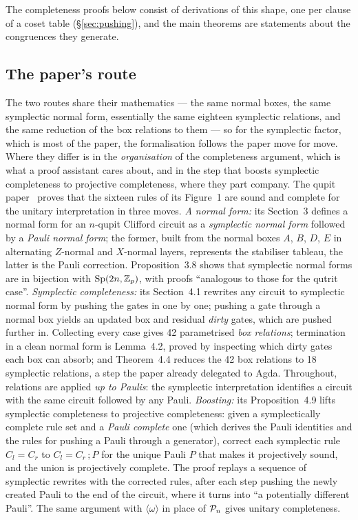\begin{minipage}[c]{0.42\textwidth}\centering
{}
\end{minipage}

\noindent The completeness proofs below consist of derivations of this
shape, one per clause of a coset table (\S\ref{sec:pushing}), and the
main theorems are statements about the congruences they generate.

\subsection{The paper's route}

The two routes share their mathematics --- the same normal boxes, the
same symplectic normal form, essentially the same eighteen symplectic
relations, and the same reduction of the box relations to them --- so
for the symplectic factor, which is most of the paper, the
formalisation follows the paper move for move.  Where they differ is
in the \emph{organisation} of the completeness argument, which is what
a proof assistant cares about, and in the step that boosts symplectic
completeness to projective completeness, where they part company.
The qupit paper~\cite{bian2026qudit} proves that the sixteen rules of
its Figure~1 are sound and complete for the unitary interpretation in
three moves.  \emph{A normal form:} its Section~3 defines a normal form
for an $n$-qupit Clifford circuit as a \emph{symplectic normal form}
followed by a \emph{Pauli normal form}; the former, built from the
normal boxes $A$, $B$, $D$, $E$ in alternating $Z$-normal and $X$-normal
layers, represents the stabiliser tableau, the latter is the Pauli
correction.  Proposition~3.8 shows that symplectic normal forms are in
bijection with $\mathrm{Sp}(2n,\mathbb{Z}_p)$, with proofs ``analogous to those for the qutrit
case''.  \emph{Symplectic completeness:} its Section~4.1 rewrites any
circuit to symplectic normal form by pushing the gates in one by one;
pushing a gate through a normal box yields an updated box and residual
\emph{dirty} gates, which are pushed further in.  Collecting every case
gives 42 parametrised \emph{box relations}; termination in a clean
normal form is Lemma~4.2, proved by inspecting which dirty gates each
box can absorb; and Theorem~4.4 reduces the 42 box relations to 18
symplectic relations, a step the paper already delegated to Agda.
Throughout, relations are applied \emph{up to Paulis}: the symplectic
interpretation identifies a circuit with the same circuit followed by
any Pauli.  \emph{Boosting:} its Proposition~4.9 lifts symplectic
completeness to projective completeness: given a symplectically
complete rule set and a \emph{Pauli complete} one (which derives the
Pauli identities and the rules for pushing a Pauli through a
generator), correct each symplectic rule $C_l = C_r$ to $C_l = C_r\,;P$
for the unique Pauli $P$ that makes it projectively sound, and the union
is projectively complete.  The proof replays a sequence of symplectic
rewrites with the corrected rules, after each step pushing the newly
created Pauli to the end of the circuit, where it turns into ``a
potentially different Pauli''.  The same argument with
$\langle\omega\rangle$ in place of $\mathcal{P}_{n}$ gives unitary completeness.

